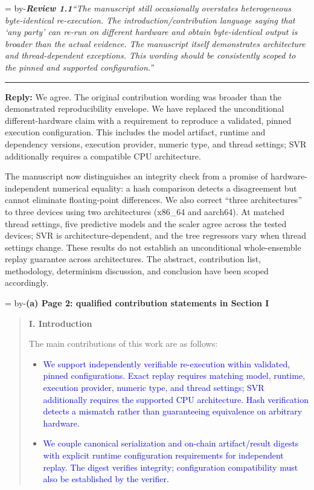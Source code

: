 \documentclass[11pt]{article}
\newenvironment{excerpt}{\begin{quote}\small\sloppy}{\end{quote}}
\newcommand{\roomfor}[1]{\par\begingroup\dimen0=\pagegoal\advance\dimen0 by-\pagetotal\ifdim\dimen0<#1\baselineskip\newpage\fi\endgroup}
\newcommand{\review}[2]{\roomfor{10}\bigskip\noindent\textbf{\textit{Review #1}}\quad\textit{``#2''}\par\smallskip\hrule\medskip}
\newcommand{\reply}{\noindent\textbf{Reply:} }
\newcommand{\loc}[1]{\roomfor{7}\medskip\noindent\textbf{#1}\par\smallskip}
\newcommand{\mshead}[2]{\par\noindent\textbf{#1. #2}\par\smallskip}
\begin{document}
\review{1.1}{The manuscript still occasionally overstates heterogeneous byte-identical re-execution. The introduction/contribution language saying that `any party' can re-run on different hardware and obtain byte-identical output is broader than the actual evidence. The manuscript itself demonstrates architecture and thread-dependent exceptions. This wording should be consistently scoped to the pinned and supported configuration.}

\reply We agree. The original contribution wording was broader
than the demonstrated reproducibility envelope. We have replaced the
unconditional different-hardware claim with a requirement to reproduce a
validated, pinned execution configuration. This includes the model artifact,
runtime and dependency versions, execution provider, numeric type, and thread
settings; SVR additionally requires a compatible CPU architecture.

The manuscript now distinguishes an integrity check from a promise of
hardware-independent numerical equality: a hash comparison detects a
disagreement but cannot eliminate floating-point differences. We also correct
``three architectures'' to three devices using two architectures (x86\_64 and
aarch64). At matched thread settings, five predictive models and the scaler
agree across the tested devices; SVR is architecture-dependent, and the tree
regressors vary when thread settings change. These results do not establish
an unconditional whole-ensemble replay guarantee across architectures.
The abstract, contribution list, methodology, determinism discussion, and
conclusion have been scoped accordingly.

\loc{(a) Page 2: qualified contribution statements in Section I}
\begin{excerpt}
\mshead{I}{Introduction}

The main contributions of this work are as follows:
\begin{itemize}
\item \textcolor{blue}{We support independently verifiable re-execution
    within validated, pinned configurations. Exact replay requires
    matching model, runtime, execution provider, numeric type, and
    thread settings; SVR additionally requires the supported CPU
    architecture. Hash verification detects a mismatch rather than
    guaranteeing equivalence on arbitrary hardware.}

    \item \textcolor{blue}{We couple canonical serialization and
    on-chain artifact/result digests with explicit runtime
    configuration requirements for independent replay. The digest
    verifies integrity; configuration compatibility must also
    be established by the verifier.}
\end{itemize}
\end{excerpt}
\end{document}
